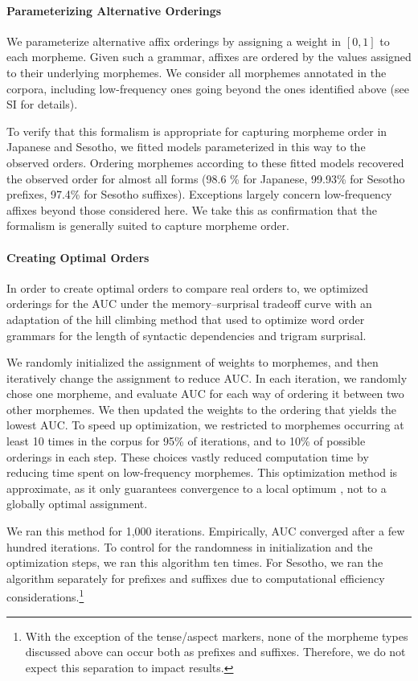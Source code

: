\paragraph{Parameterizing Alternative Orderings}

We parameterize alternative affix orderings by assigning a weight in $[0,1]$ to each morpheme.
Given such a grammar, affixes are ordered by the values assigned to their underlying morphemes.
We consider all morphemes annotated in the corpora, including low-frequency ones going beyond the ones identified above (see SI for details).


To verify that this formalism is appropriate for capturing morpheme order in Japanese and Sesotho, we fitted models parameterized in this way to the observed orders.
Ordering morphemes according to these fitted models recovered the observed order for almost all forms (98.6 \% for Japanese, 99.93\% for Sesotho prefixes, 97.4\% for Sesotho suffixes). Exceptions largely concern low-frequency affixes beyond those considered here. We take this as confirmation that the formalism is generally suited to capture morpheme order.


\paragraph{Creating Optimal Orders}

In order to create optimal orders to compare real orders to, we optimized orderings for the AUC under the memory--surprisal tradeoff curve with an adaptation of the hill climbing method that \citet{gildea-human-2015} used to optimize word order grammars for the length of syntactic dependencies and trigram surprisal.

We randomly initialized the assignment of weights to morphemes, and then iteratively change the assignment to reduce AUC.
In each iteration, we randomly chose one morpheme, and evaluate AUC for each way of ordering it between two other morphemes.
We then updated the weights to the ordering that yields the lowest AUC.
To speed up optimization, we restricted to morphemes occurring at least 10 times in the corpus for 95\% of iterations, and to 10\% of possible orderings in each step.
These choices vastly reduced computation time by reducing time spent on low-frequency morphemes.
This optimization method is approximate, as it only guarantees convergence to a local optimum \citep{gildea-human-2015}, not to a globally optimal assignment.

We ran this method for 1,000 iterations. Empirically, AUC converged after a few hundred iterations.
To control for the randomness in initialization and the optimization steps, we ran this algorithm ten times.
For Sesotho, we ran the algorithm separately for prefixes and suffixes due to computational efficiency considerations.\footnote{With the exception of the tense/aspect markers, none of the morpheme types discussed above can occur both as prefixes and suffixes. Therefore, we do not expect this separation to impact results.}

